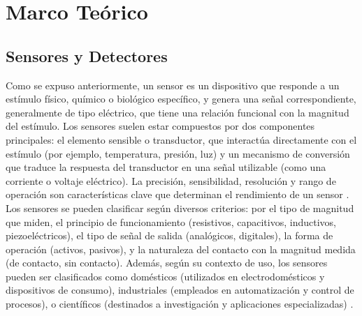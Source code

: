 \documentclass[]{book}
\begin{document}
\section{Marco Teórico}
\subsection{Sensores y Detectores}

\noindent Como se expuso anteriormente, un sensor es un dispositivo que responde a un estímulo físico, químico o biológico específico, y genera una señal correspondiente, generalmente de tipo eléctrico, que tiene una relación funcional con la magnitud del estímulo. Los sensores suelen estar compuestos por dos componentes principales: el elemento sensible o transductor, que interactúa directamente con el estímulo (por ejemplo, temperatura, presión, luz) y un mecanismo de conversión que traduce la respuesta del transductor en una señal utilizable (como una corriente o voltaje eléctrico). La precisión, sensibilidad, resolución y rango de operación son características clave que determinan el rendimiento de un sensor \cite{webster2018measurement}.\\

\noindent Los sensores se pueden clasificar según diversos criterios: por el tipo de magnitud que miden, el principio de funcionamiento (resistivos, capacitivos, inductivos, piezoeléctricos), el tipo de señal de salida (analógicos, digitales), la forma de operación (activos, pasivos), y la naturaleza del contacto con la magnitud medida (de contacto, sin contacto). Además, según su contexto de uso, los sensores pueden ser clasificados como domésticos (utilizados en electrodomésticos y dispositivos de consumo), industriales (empleados en automatización y control de procesos), o científicos (destinados a investigación y aplicaciones especializadas) \cite{sinclair2000sensors}.\\
\end{document}
